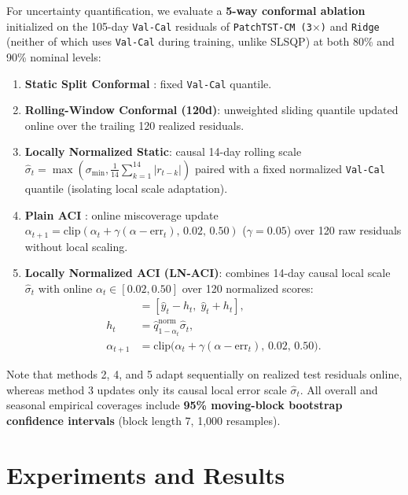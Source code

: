 \documentclass[5p,twocolumn,authoryear]{elsarticle}
\begin{document}
For uncertainty quantification, we evaluate a \textbf{5-way conformal ablation} initialized on the 105-day \texttt{Val-Cal} residuals of \texttt{PatchTST-CM (3$\times$)} and \texttt{Ridge} (neither of which uses \texttt{Val-Cal} during training, unlike SLSQP) at both 80\% and 90\% nominal levels:
\begin{enumerate}
    \item \textbf{Static Split Conformal} \citep{lei2018conformal}: fixed \texttt{Val-Cal} quantile.
    \item \textbf{Rolling-Window Conformal (120d)}: unweighted sliding quantile updated online over the trailing 120 realized residuals.
    \item \textbf{Locally Normalized Static}: causal 14-day rolling scale $\hat{\sigma}_t = \max(\sigma_{\min}, \frac{1}{14}\sum_{k=1}^{14}|r_{t-k}|)$ paired with a fixed normalized \texttt{Val-Cal} quantile (isolating local scale adaptation).
    \item \textbf{Plain ACI} \citep{gibbs2021aci}: online miscoverage update $\alpha_{t+1} = \text{clip}(\alpha_t + \gamma(\alpha - \text{err}_t),\, 0.02,\, 0.50)$ ($\gamma=0.05$) over 120 raw residuals without local scaling.
    \item \textbf{Locally Normalized ACI (LN-ACI)}: combines 14-day causal local scale $\hat{\sigma}_t$ with online $\alpha_t \in [0.02, 0.50]$ over 120 normalized scores:
    \begin{align}
        [L_t, U_t] &= \left[\hat{y}_t - h_t,\; \hat{y}_t + h_t\right], \\
        h_t &= \hat{q}_{1-\alpha_t}^{\text{norm}}\hat{\sigma}_t, \\
        \alpha_{t+1} &= \text{clip}\!\Big(\alpha_t + \gamma(\alpha - \text{err}_t),\, 0.02,\, 0.50\Big).
    \end{align}
\end{enumerate}
Note that methods 2, 4, and 5 adapt sequentially on realized test residuals online, whereas method 3 updates only its causal local error scale $\hat{\sigma}_t$. All overall and seasonal empirical coverages include \textbf{95\% moving-block bootstrap confidence intervals} (block length 7, 1,000 resamples).

\FloatBarrier

\section{Experiments and Results}
\end{document}
